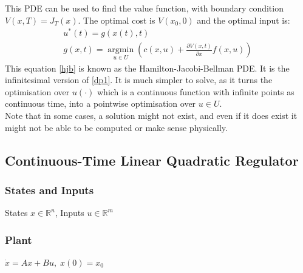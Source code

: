 \documentclass{article}
\begin{document}
This PDE can be used to find the value function, with boundary condition $V(x,T) = J_T(x)$. The optimal cost is $V(x_0,0)$ and the optimal input is:
\[
\begin{aligned}
    u^*(t) = g(x(t),t)  \\
    g(x,t) = \operatorname*{argmin}_{u \in U} \left( c(x,u)  + \frac{\partial V(x,t)}{\partial x} f(x,u)  \right)
\end{aligned}
\]
This equation \eqref{hjb} is known as the Hamilton-Jacobi-Bellman PDE. It is the infinitesimal version of \eqref{dp1}. It is much simpler to solve, as it turns the optimisation over $u(\cdot)$ which is a continuous function with infinite points as continuous time, into a pointwise optimisation over $u \in U$. \\
Note that in some cases, a solution might not exist, and even if it does exist it might not be able to be computed or make sense physically.
\subsection{Continuous-Time Linear Quadratic Regulator}
\subsubsection*{States and Inputs}
States $x \in \mathbb{R}^n$, Inputs $u \in \mathbb{R}^m$
\subsubsection*{Plant}
$\dot x = Ax + Bu, \; x(0) = x_0$
\end{document}
